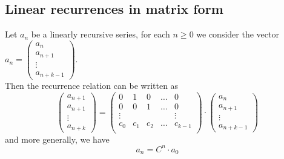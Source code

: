 \documentclass[../main.tex]{subfiles}
\begin{document}
\subsection{Linear recurrences in matrix form}
Let $a_n$ be a linearly recursive series, for each $n \geq 0$ we consider the vector $a_n = \begin{pmatrix}
a_n\\a_{n+1} \\ \vdots \\ a_{n+k-1} 
\end{pmatrix}
$.\\
Then the recurrence relation can be written as
\[ 
\begin{pmatrix}
a_{n+1} \\ a_{n+1}  \\ \vdots \\ a_{n+k} 
\end{pmatrix}
=
\begin{pmatrix}
	0 & 1 & 0 & \ldots & 0 \\
	0 & 0 & 1 & \ldots & 0 \\
	\vdots &  &  &  & \vdots \\
	c_0 & c_1 & c_2 & \ldots & c_{k-1}  \\
\end{pmatrix}
\cdot
\begin{pmatrix}
a_n \\ a_{n+1} \\ \vdots \\ a_{n+k-1} 
\end{pmatrix}
\]
and more generally, we have
\[ 
a_n = C^{n} \cdot a_0
\]
\end{document}

